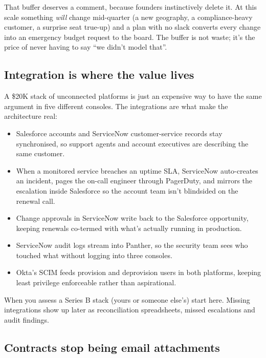 That buffer deserves a comment, because founders instinctively delete it. At this scale something \emph{will} change mid-quarter (a new geography, a compliance-heavy customer, a surprise seat true-up) and a plan with no slack converts every change into an emergency budget request to the board. The buffer is not waste; it's the price of never having to say ``we didn't model that''.



\subsection{Integration is where the value lives}


A \$20K stack of unconnected platforms is just an expensive way to have the same argument in five different consoles. The integrations are what make the architecture real:


\begin{itemize}[leftmargin=*]
\item Salesforce accounts and ServiceNow customer-service records stay synchronised, so support agents and account executives are describing the same customer.
\item When a monitored service breaches an uptime SLA, ServiceNow auto-creates an incident, pages the on-call engineer through PagerDuty, and mirrors the escalation inside Salesforce so the account team isn't blindsided on the renewal call.
\item Change approvals in ServiceNow write back to the Salesforce opportunity, keeping renewals co-termed with what's actually running in production.
\item ServiceNow audit logs stream into Panther, so the security team sees who touched what without logging into three consoles.
\item Okta's SCIM feeds provision and deprovision users in both platforms, keeping least privilege enforceable rather than aspirational.
\end{itemize}

When you assess a Series B stack (yours or someone else's) start here. Missing integrations show up later as reconciliation spreadsheets, missed escalations and audit findings.



\subsection{Contracts stop being email attachments}


